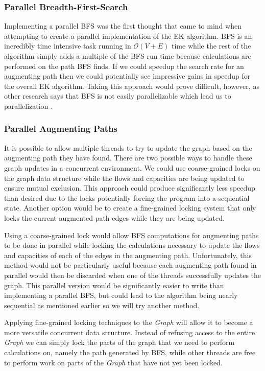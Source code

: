\subsubsection{Parallel Breadth-First-Search}
Implementing a parallel BFS was the first thought that came to mind when attempting to create a parallel implementation of the EK algorithm. BFS is an incredibly time intensive task running in $\mathcal{O}(V+E)$ time while the rest of the algorithm simply adds a multiple of the BFS run time because calculations are performed on the path BFS finds. If we could speedup the search rate for an augmenting path then we could potentially see impressive gains in speedup for the overall EK algorithm. Taking this approach would prove difficult, however, as other research says that BFS is not easily parallelizable which lead us to parallelization \cite{vineet}.

\subsubsection{Parallel Augmenting Paths}
It is possible to allow multiple threads to try to update the graph based on the augmenting path they have found. There are two possible ways to handle these graph updates in a concurrent environment. We could use coarse-grained locks on the graph data structure while the flows and capacities are being updated to ensure mutual exclusion. This approach could produce significantly less speedup than desired due to the locks potentially forcing the program into a sequential state. Another option would be to create a fine-grained locking system that only locks the current augmented path edges while they are being updated.   

Using a coarse-grained lock would allow BFS computations for augmenting paths to be done in parallel while locking the calculations necessary to update the flows and capacities of each of the edges in the augmenting path. Unfortunately, this method would not be particularly useful because each augmenting path found in parallel would then be discarded when one of the threads successfully updates the graph. This parallel version would be significantly easier to write than implementing a parallel BFS, but could lead to the algorithm being nearly sequential as mentioned earlier so we will try another method.

Applying fine-grained locking techniques to the \textit{Graph} will allow it to become a more versatile concurrent data structure. Instead of refusing access to the entire \textit{Graph} we can simply lock the parts of the graph that we need to perform calculations on, namely the path generated by BFS, while other threads are free to perform work on parts of the \textit{Graph} that have not yet been locked.

